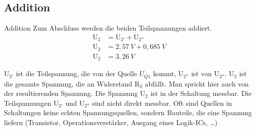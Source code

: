 \subsection{Addition}
\begin{frame}{Addition}
  Zum Abschluss werden die beiden Teilspannungen addiert.
  \begin{align}
    \text{U}_2 &= \text{U}_{2'} + \text{U}_{2''}\\
    \text{U}_2 &= 2,57\ V + 0,685\ V\\
    \text{U}_2 &= 3,26\ V
  \end{align}
\end{frame}
$\text{U}_{2'}$ ist die Teilspannung, die von der Quelle $U\text{}_{Q1}$ kommt, $\text{U}_{2''}$ ist von $\text{U}_{2''}$. $\text{U}_2$ ist die gesamte  Spannung, die an Widerstand $\text{R}_2$ abfällt. Man spricht hier auch von der resultierenden Spannung. Die Spannung $\text{U}_2$ ist in der Schaltung messbar. Die Teilspannungen $\text{U}_{2'}$ und $\text{U}_{2''}$ sind nicht direkt messbar. Oft sind Quellen in Schaltungen keine echten Spannungsquellen, sondern Bauteile, die eine Spannung liefern (Transistor, Operationsverstärker, Ausgang eines Logik-ICs, \dots)
